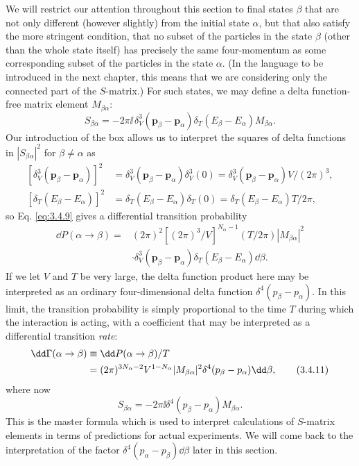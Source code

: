 We will restrict our attention throughout this section to final states $\beta$ that are not only
different (however slightly) from the initial state $\alpha$, but that also satisfy the more
stringent condition, that no subset of the particles in the state $\beta$ (other than the whole
state itself) has precisely the same four-momentum as some corresponding subset of the particles
in the state $\alpha$. (In the language to be introduced in the next chapter, this means that
we are considering only the connected part of the $S$-matrix.) For such states, we may define
a delta function-free matrix element $M_{\beta\alpha}$:
\begin{equation}
 S_{\beta\alpha}=-2\pi \ii\,\delta_V^3(\mathbf{p}_\beta-\mathbf{p}_\alpha)
 \delta_T(E_\beta-E_\alpha)M_{\beta\alpha}.
 \tag{3.4.10}\label{eq:3.4.10}
\end{equation}
Our introduction of the box allows us to interpret the squares of delta functions in
$|S_{\beta\alpha}|^2$ for $\beta\ne\alpha$ as
\begin{align*}
 \left[\delta_V^3(\mathbf{p}_\beta-\mathbf{p}_\alpha)\right]^2
 &=\delta_V^3(\mathbf{p}_\beta-\mathbf{p}_\alpha)\delta_V^3(0)
 =\delta_V^3(\mathbf{p}_\beta-\mathbf{p}_\alpha)V/(2\pi)^3,\\
 \left[\delta_T(E_\beta-E_\alpha)\right]^2
 &=\delta_T(E_\beta-E_\alpha)\delta_T(0)
 =\delta_T(E_\beta-E_\alpha)T/2\pi,
\end{align*}
so Eq. \eqref{eq:3.4.9} gives a differential transition probability
\begin{align*}
 \dd P(\alpha\to\beta)={}&(2\pi)^2\left[(2\pi)^3/V\right]^{N_\alpha-1}
 (T/2\pi)|M_{\beta\alpha}|^2\\
 &\cdot\delta_V^3(\mathbf{p}_\beta-\mathbf{p}_\alpha)
 \delta_T(E_\beta-E_\alpha)\dd\beta.
\end{align*}
If we let $V$ and $T$ be very large, the delta function product here may be interpreted as an
ordinary four-dimensional delta function $\delta^4(p_\beta-p_\alpha)$. In this limit, the
transition probability is simply proportional to the time $T$ during which the interaction is
acting, with a coefficient that may be interpreted as a differential transition \emph{rate}:
\begin{align}
 \dd\Gamma(\alpha\to\beta)&\equiv \dd P(\alpha\to\beta)/T\notag\\
 &=(2\pi)^{3N_\alpha-2}V^{1-N_\alpha}|M_{\beta\alpha}|^2
 \delta^4(p_\beta-p_\alpha)\dd\beta,
 \tag{3.4.11}\label{eq:3.4.11}
\end{align}
where now
\begin{equation}
 S_{\beta\alpha}=-2\pi \ii\delta^4(p_\beta-p_\alpha)M_{\beta\alpha}.
 \tag{3.4.12}\label{eq:3.4.12}
\end{equation}
This is the master formula which is used to interpret calculations of $S$-matrix elements in
terms of predictions for actual experiments. We will come back to the interpretation of the
factor $\delta^4(p_\alpha-p_\beta)\dd\beta$ later in this section.

